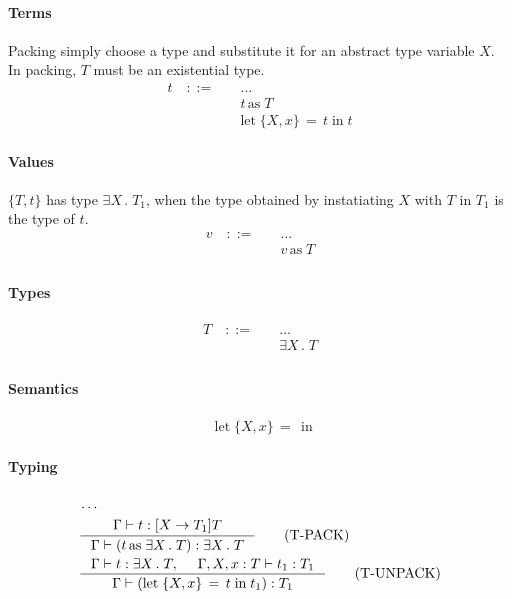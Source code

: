 \documentclass{article}
\newcommand{\typjud}[2]{\Gamma \vdash #1: #2}
\newcommand{\typjudp}[2]{\Gamma \vdash \left(#1\right): #2}
\newcommand{\equant}[2]{\exists #1 \, .\; #2}
\newcommand{\epack}[2]{#1 \,\mathrm{as}\; #2}
\newcommand{\elet}[4]{\text{let}\; \{#1, #2\}\, =\, #3 \;\text{in}\; #4}
\begin{document}
\paragraph{Terms}
  Packing simply choose a type and substitute it for an abstract type variable $X$.
  In packing, $T$ must be an existential type.
  \begin{align*}
    t \quad ::= \quad & \ldots \\
      & \epack{t}{T} \tag{packing} \\
      & \elet{X}{x}{t}{t} \tag{unpacking}
  \end{align*}

\paragraph{Values}
  $\{T, t\}$ has type $\equant{X}{T_1}$,
  when the type obtained by instatiating $X$ with $T$ in $T_1$ is the type of $t$.
  \begin{align*}
    v \quad ::= \quad & \ldots \\
      & \epack{v}{T}\\
  \end{align*}

\paragraph{Types}
  \begin{align*}
    T \quad ::= \quad & \ldots \\
      & \equant{X}{T} \tag{existential type} \\
  \end{align*}

\paragraph{Semantics}
  \begin{align*}
    & \elet{X}{x}{}
  \end{align*}

\paragraph{Typing}
  \begin{align*}
    & \ldots \\
    & \inference
      {\typjud{t}{[X\to T_1] T}}
      {\typjudp{\epack{t}{\equant{X}{T}}}{\equant{X}{T}}}
      \tag{T-PACK} \\
    & \inference
      {\typjud{t}{\equant{X}{T}},&
       \Gamma, X, x : T \vdash t_1 : T_1
      }{
        \typjudp{\elet{X}{x}{t}{t_1}}{T_1}
      }
      \tag{T-UNPACK}
  \end{align*}
\end{document}
